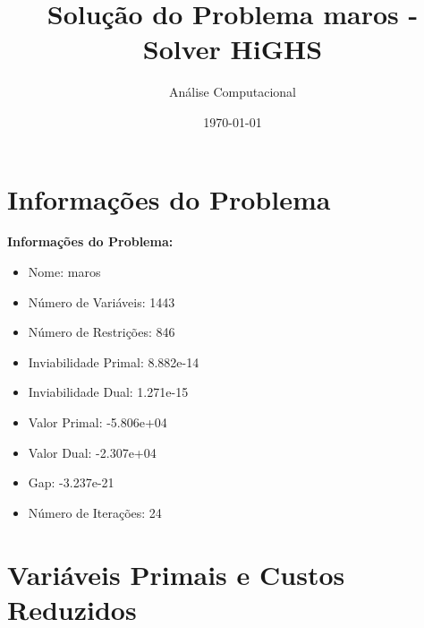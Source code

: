 \documentclass[12pt]{article}
\title{Solução do Problema maros - Solver HiGHS}
\author{Análise Computacional}
\date{\today}
\begin{document}
\maketitle

\section{Informações do Problema}

\textbf{Informações do Problema:}
\begin{itemize}
\item Nome: maros
\item Número de Variáveis: 1443
\item Número de Restrições: 846
\item Inviabilidade Primal: 8.882e-14
\item Inviabilidade Dual: 1.271e-15
\item Valor Primal: -5.806e+04
\item Valor Dual: -2.307e+04
\item Gap: -3.237e-21
\item Número de Iterações: 24
\end{itemize}


\section{Variáveis Primais e Custos Reduzidos}
\end{document}
